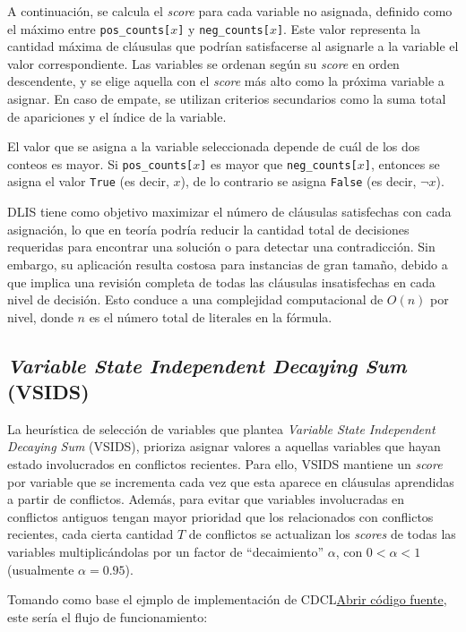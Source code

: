 A continuación, se calcula el \textit{score} para cada variable no asignada, definido como el máximo entre \texttt{pos\_counts[$x$]} y \texttt{neg\_counts[$x$]}. Este valor representa la cantidad máxima de cláusulas que podrían satisfacerse al asignarle a la variable el valor correspondiente. Las variables se ordenan según su \textit{score} en orden descendente, y se elige aquella con el \textit{score} más alto como la próxima variable a asignar. En caso de empate, se utilizan criterios secundarios como la suma total de apariciones y el índice de la variable.

El valor que se asigna a la variable seleccionada depende de cuál de los dos conteos es mayor. Si \texttt{pos\_counts[$x$]} es mayor que \texttt{neg\_counts[$x$]}, entonces se asigna el valor \texttt{True} (es decir, $x$), de lo contrario se asigna \texttt{False} (es decir, $\neg x$).

DLIS tiene como objetivo maximizar el número de cláusulas satisfechas con cada asignación, lo que en teoría podría reducir la cantidad total de decisiones requeridas para encontrar una solución o para detectar una contradicción. Sin embargo, su aplicación resulta costosa para instancias de gran tamaño, debido a que implica una revisión completa de todas las cláusulas insatisfechas en cada nivel de decisión. Esto conduce a una complejidad computacional de $O(n)$ por nivel, donde $n$ es el número total de literales en la fórmula.


\subsection{\textit{Variable State Independent Decaying Sum} (VSIDS)}
\label{subsec:vsids}

La heurística de selecci\'on de variables que plantea \textit{Variable State Independent Decaying Sum} (VSIDS), prioriza asignar valores a aquellas variables que hayan estado involucrados en conflictos recientes. Para ello, VSIDS mantiene un \textit{score} por variable que se incrementa cada vez que esta aparece en cláusulas aprendidas a partir de conflictos. Además, para evitar que variables involucradas en conflictos antiguos tengan mayor prioridad que los relacionados con conflictos recientes, cada cierta cantidad \( T \) de conflictos se actualizan los \textit{scores} de todas las variables multiplicándolas por un factor de ``decaimiento'' \(\alpha\), con \(0 < \alpha < 1\) (usualmente \(\alpha = 0.95\)). 

Tomando como base el ejmplo de implementaci\'on de CDCL\href{Graphics/dpll\_cdcl\_sat\_solver.py}{Abrir c\'odigo fuente}, este ser\'ia el flujo de funcionamiento:

